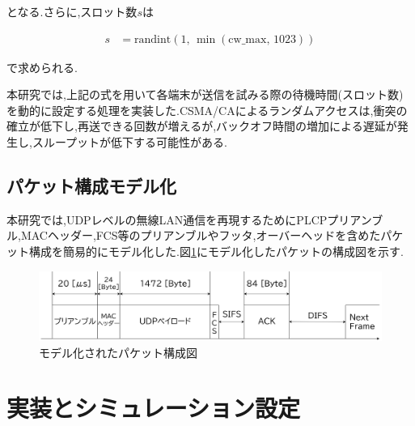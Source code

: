 \documentclass[a4paper, 10pt]{ltjsarticle}
\begin{document}
となる.さらに,スロット数$s$は

\begin{align}
  s &= \mathrm{randint}(1, \, \min(\text{cw\_max}, \, 1023))
  \label{slot}
\end{align}

で求められる.

本研究では,上記の式を用いて各端末が送信を試みる際の待機時間(スロット数)を動的に設定する処理を実装した.CSMA/CAによるランダムアクセスは,衝突の確立が低下し,再送できる回数が増えるが,バックオフ時間の増加による遅延が発生し,スループットが低下する可能性がある.

\subsection{パケット構成モデル化}

本研究では,UDPレベルの無線LAN通信を再現するためにPLCPプリアンブル,MACヘッダー,FCS等のプリアンブルやフッタ,オーバーヘッドを含めたパケット構成を簡易的にモデル化した.図\ref{packet}にモデル化したパケットの構成図を示す.





\begin{figure}[H]
  \centering
  \includegraphics[width=1\columnwidth]{./assets/packet.png}
  \caption{モデル化されたパケット構成図}
  \label{packet}
\end{figure}



\section{実装とシミュレーション設定}
\end{document}
